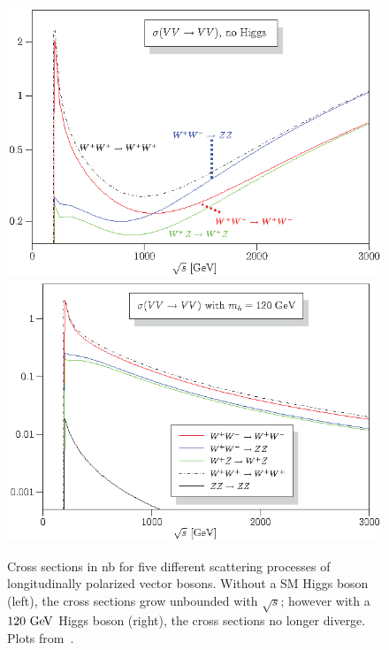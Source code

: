 \begin{figure}[htbp]
  \centering
  \includegraphics[height=.25\textheight]{figs/ssww_13tev/introduction/vbs_xsec_nohiggs}
  \includegraphics[height=.25\textheight]{figs/ssww_13tev/introduction/vbs_xsec_higgs120}
 
  \caption{Cross sections in nb for five different scattering processes of longitudinally polarized vector bosons.  Without a SM Higgs boson (left), the cross sections grow unbounded with $\sqrt{s}$; however with a $120\gev$ Higgs boson (right), the cross sections no longer diverge.  Plots from~\cite{2008.vbs-resonances-unitarity}. }
  \label{fig:ssww13tev_vbs_xsec_higgs}
\end{figure}

